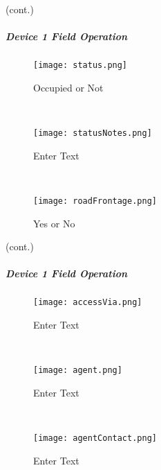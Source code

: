 {\footnotesize (cont.)}
\vspace{.8in}

\vspace{2in}

\vspace{3in}

\clearpage


\subparagraph*{Device 1 Field Operation}
\begin{wrapfigure}{r}{0.4\textwidth}
\centering
    \texttt{[image: status.png]}
\caption {Occupied or Not}
\vspace{.05in}

\HRule \\[.4cm] %
\vspace{.05in}

    \texttt{[image: statusNotes.png]}
\caption{Enter Text}
\vspace{.05in}

\HRule \\[.4cm] %
\vspace{.05in}

    \texttt{[image: roadFrontage.png]}
\caption{Yes or No}
\end{wrapfigure}

{\footnotesize (cont.)}
\vspace{.8in}


\vspace{2.7in}

\vspace{2.5in}

\clearpage
\subparagraph*{Device 1 Field Operation}
\begin{wrapfigure}{r}{0.4\textwidth}
\centering
    \texttt{[image: accessVia.png]}
\caption {Enter Text}
\vspace{.05in}

\HRule \\[.4cm] %
\vspace{.05in}

    \texttt{[image: agent.png]}
\caption{Enter Text}
\vspace{.05in}

\HRule \\[.4cm] %
\vspace{.05in}

    \texttt{[image: agentContact.png]}
\caption{Enter Text}
\end{wrapfigure}

